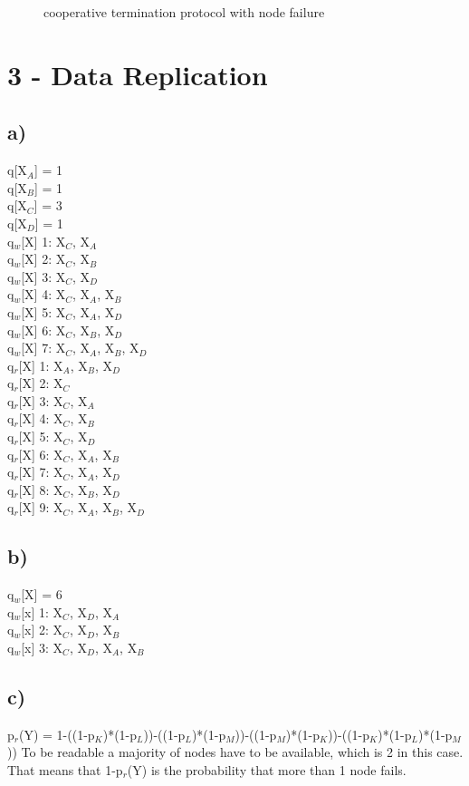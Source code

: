 \documentclass{scrartcl}
\begin{document}
\begin{figure}[!ht]
	\caption{cooperative termination protocol with node failure}
	\label{fig:2c}
\end{figure}

\newpage
\section*{3 - Data Replication}
\subsection*{a)}
q[X$_A$] = 1\\
q[X$_B$] = 1\\
q[X$_C$] = 3\\
q[X$_D$] = 1\\

q$_w$[X] 1: X$_C$, X$_A$ \\
q$_w$[X] 2: X$_C$, X$_B$ \\
q$_w$[X] 3: X$_C$, X$_D$ \\
q$_w$[X] 4: X$_C$, X$_A$, X$_B$ \\
q$_w$[X] 5: X$_C$, X$_A$, X$_D$ \\
q$_w$[X] 6: X$_C$, X$_B$, X$_D$ \\
q$_w$[X] 7: X$_C$, X$_A$, X$_B$, X$_D$\\


q$_r$[X] 1: X$_A$, X$_B$, X$_D$\\
q$_r$[X] 2: X$_C$\\
q$_r$[X] 3: X$_C$, X$_A$\\
q$_r$[X] 4: X$_C$, X$_B$\\
q$_r$[X] 5: X$_C$, X$_D$\\
q$_r$[X] 6: X$_C$, X$_A$, X$_B$\\
q$_r$[X] 7: X$_C$, X$_A$, X$_D$\\
q$_r$[X] 8: X$_C$, X$_B$, X$_D$\\
q$_r$[X] 9: X$_C$, X$_A$, X$_B$, X$_D$\\

\subsection*{b)}
q$_w$[X] = 6\\
q$_w$[x] 1: X$_C$, X$_D$, X$_A$\\
q$_w$[x] 2: X$_C$, X$_D$, X$_B$\\
q$_w$[x] 3: X$_C$, X$_D$, X$_A$, X$_B$\\


\subsection*{c)}
p$_r$(Y) = 1-((1-p$_K$)*(1-p$_L$))-((1-p$_L$)*(1-p$_M$))-((1-p$_M$)*(1-p$_K$))-((1-p$_K$)*(1-p$_L$)*(1-p$_M$))
To be readable a majority of nodes have to be available, which is 2 in this case. That means that 1-p$_r$(Y) is the probability that more than 1 node fails.
\end{document}
